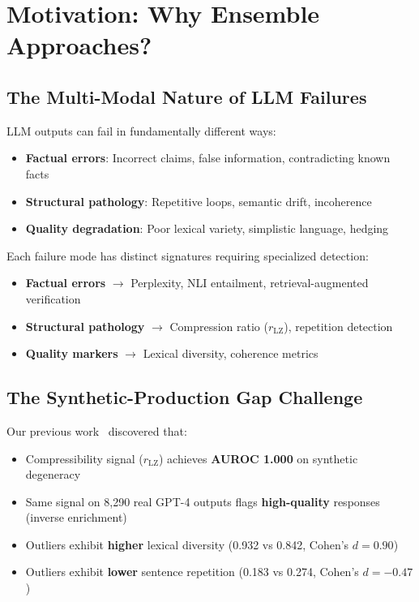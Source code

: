 \documentclass[11pt]{article}
\begin{document}
\section{Motivation: Why Ensemble Approaches?}
\label{sec:motivation}

\subsection{The Multi-Modal Nature of LLM Failures}

LLM outputs can fail in fundamentally different ways:
\begin{itemize}
\item \textbf{Factual errors}: Incorrect claims, false information, contradicting known facts
\item \textbf{Structural pathology}: Repetitive loops, semantic drift, incoherence
\item \textbf{Quality degradation}: Poor lexical variety, simplistic language, hedging
\end{itemize}

Each failure mode has distinct signatures requiring specialized detection:
\begin{itemize}
\item \textbf{Factual errors} $\rightarrow$ Perplexity, NLI entailment, retrieval-augmented verification
\item \textbf{Structural pathology} $\rightarrow$ Compression ratio ($r_{\text{LZ}}$), repetition detection
\item \textbf{Quality markers} $\rightarrow$ Lexical diversity, coherence metrics
\end{itemize}

\subsection{The Synthetic-Production Gap Challenge}

Our previous work~\cite{khokhla2025synthetic} discovered that:
\begin{itemize}
\item Compressibility signal ($r_{\text{LZ}}$) achieves \textbf{AUROC 1.000} on synthetic degeneracy
\item Same signal on 8,290 real GPT-4 outputs flags \textbf{high-quality} responses (inverse enrichment)
\item Outliers exhibit \textbf{higher} lexical diversity (0.932 vs 0.842, Cohen's $d=0.90$)
\item Outliers exhibit \textbf{lower} sentence repetition (0.183 vs 0.274, Cohen's $d=-0.47$)
\end{itemize}
\end{document}
